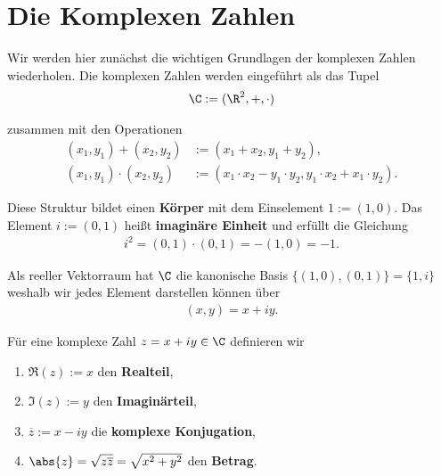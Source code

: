\documentclass[letterpaper,10pt,german]{jupyterBook}
\begin{document}
\section{Die Komplexen Zahlen}
\label{\detokenize{complexanalysis/complexnumbers:die-komplexen-zahlen}}\label{\detokenize{complexanalysis/complexnumbers::doc}}
\par
Wir werden hier zunächst die wichtigen Grundlagen der komplexen Zahlen wiederholen.
Die komplexen Zahlen werden eingeführt als das Tupel
\begin{align*}
\C := (\R^2,+,\cdot)
\end{align*}
\par
zusammen mit den Operationen
\begin{align*}
(x_1,y_1) + (x_2,y_2) &:= (x_1 + x_2, y_1+y_2),\\
(x_1,y_1) \cdot (x_2,y_2) &:= (x_1\cdot x_2 - y_1\cdot y_2, y_1\cdot x_2 + x_1\cdot y_2).
\end{align*}
\par
Diese Struktur bildet einen \textbf{Körper} mit dem Einselement \(1:=(1,0)\). Das Element \(i:=(0,1)\) heißt \textbf{imaginäre Einheit} und erfüllt die Gleichung
\begin{align*}
i^2 = (0,1)\cdot(0,1) = -(1,0) = -1.
\end{align*}
\par
Als reeller Vektorraum hat \(\C\) die kanonische Basis \(\{(1,0),(0,1)\}=\{1,i\}\) weshalb wir jedes Element darstellen können über
\begin{align*}
(x,y) = x + iy.
\end{align*}
\par
Für eine komplexe Zahl \(z=x+ iy\in\C\) definieren wir
\begin{enumerate}

\item {} 
\par
\(\Re(z):= x\) den \textbf{Realteil},

\item {} 
\par
\(\Im(z):=y\) den \textbf{Imaginärteil},

\item {} 
\par
\(\overline{z}:= x-iy\) die \textbf{komplexe Konjugation},

\item {} 
\par
\(\abs{z} = \sqrt{z\overline{z}} = \sqrt{x^2+y^2}\) den \textbf{Betrag}.

\end{enumerate}
\end{document}
